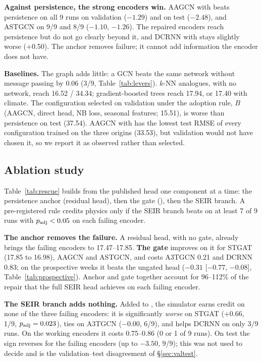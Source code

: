 \textbf{Against persistence, the strong encoders win.} AAGCN with \model{} beats
persistence on all 9 runs on validation ($-1.29$) and on test ($-2.48$), and ASTGCN
on 9/9 and 8/9 ($-1.10$, $-1.26$). The repaired encoders reach persistence but do not
go clearly beyond it, and DCRNN with \model{} stays slightly worse (+0.50). The
anchor removes failure; it cannot add information the encoder does not have.

\textbf{Baselines.} The graph adds little: a GCN beats the same network without
message passing by 0.06 (3/9, Table~\ref{tab:levers}). $k$-NN analogues, with no
network, reach 16.52 / 34.34; gradient-boosted trees reach 17.94, or 17.40 with
climate. The configuration selected on validation under the adoption rule, $B$ (AAGCN,
direct head, NB loss,
seasonal features; 15.51), is worse than persistence on test (37.54). AAGCN with
\model{} has the lowest test RMSE of every configuration trained on the three origins
(33.53), but validation
would not have chosen it, so we report it as observed rather than selected.

\subsection{Ablation study}
\label{sec:ablation}
Table~\ref{tab:rescue} builds \model{} from the published head one component at a
time: the persistence anchor (residual head), then the gate (\model{}), then the SEIR
branch. A pre-registered rule credits physics only if the SEIR branch beats \model{}
on at least 7 of 9 runs with $p_{\text{adj}}<0.05$ on each failing encoder.

\textbf{The anchor removes the failure.} A residual head, with no gate, already brings
the failing encoders to 17.47--17.85. \textbf{The gate} improves on it for STGAT
(17.85 to 16.98), AAGCN and ASTGCN, and costs A3TGCN 0.21 and DCRNN 0.83; on the
prospective weeks it beats the ungated head ($-0.31$ [$-0.77$, $-0.08$],
Table~\ref{tab:prospective}). Anchor and gate together account for 96--112\% of the
repair that the full SEIR head achieves on each failing encoder.

\textbf{The SEIR branch adds nothing.} Added to \model{}, the simulator earns credit on
none of the three failing encoders: it is significantly \emph{worse} on STGAT ($+0.66$,
1/9, $p_{\text{adj}}=0.023$), ties on A3TGCN ($-0.00$, 6/9), and helps DCRNN on only 3/9 runs.
On the working encoders it costs 0.75--0.86 (0 or 1 of 9 runs). On test the sign
reverses for the failing encoders (up to $-3.50$, 9/9); this was not used to decide
and is the validation--test disagreement of \S\ref{sec:valtest}.

